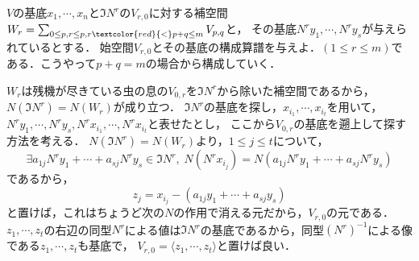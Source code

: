\documentclass[uplatex, dvipdfmx]{jsreport}
\begin{document}
\begin{problem}
    $V$の基底$x_1,\cdots,x_n$と$\Im N^r$の$V_{r,0}$に対する補空間$W_r=\sum_{0\le p,r\le p,r\textcolor{red}{<}p+q\le m}V_{p,q}$と，
    その基底$N^ry_1,\cdots,N^ry_s$が与えられているとする．
    始空間$V_{r,0}$とその基底の構成算譜を与えよ．$(1\le r\le m)$である．こうやって$p+q=m$の場合から構成していく．
\end{problem}
\begin{Proof}[［解答］]
    $W_r$は残機が尽きている虫の息の$V_{0,r}$を$\Im N^r$から除いた補空間であるから，$N(\Im N^r)=N(W_r)$が成り立つ．
    $\Im N^r$の基底を探し，$x_{i_1},\cdots,x_{i_t}$を用いて，$N^ry_1,\cdots,N^ry_s,N^rx_{i_1},\cdots,N^rx_{i_t}$と表せたとし，
    ここから$V_{0,r}$の基底を遡上して探す方法を考える．
    $N(\Im N^r)=N(W_r)$より，$1\le j\le t$について，
    \[ \exists a_{1j}N^ry_1+\cdots+a_{sj}N^ry_s\in\Im N^r,\; N(N^{r}x_{i_j})=N(a_{1j}N^ry_1+\cdots+a_{sj}N^ry_s) \]
    であるから，
    \[ z_j=x_{i_j}-(a_{1j}y_1+\cdots+a_{sj}y_s) \]
    と置けば，これはちょうど次の$N$の作用で消える元だから，$V_{r,0}$の元である．
    $z_1,\cdots,z_t$の右辺の同型$N^r$による値は$\Im N^r$の基底であるから，同型$(N^r)^{-1}$による像である$z_1,\cdots,z_t$も基底で，
    $V_{r,0}=\langle z_1,\cdots,z_t\rangle$と置けば良い．
\end{Proof}
\end{document}
